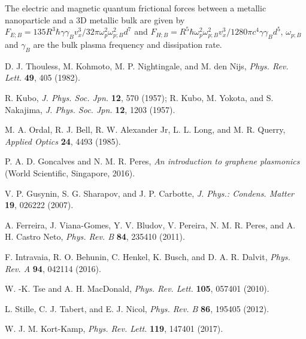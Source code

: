 \documentclass[10pt,aps,prl,superscriptaddress,showpacs,twocolumn]{revtex4-1}
\begin{document}
\begin{thebibliography}{1}
The electric and magnetic quantum frictional forces between a metallic nanoparticle and a 3D metallic bulk are given by $F_{E;B} = 135 R^3 \hbar \gamma \gamma_B v_x^3/ 32 \pi \omega_p^2  \omega_{p;B}^2 d^{7}$ and $F_{H;B} = R^5 \hbar \omega_p^2 \omega_{p;B}^2 v_x^3/1280 \pi c^4 \gamma \gamma_B d^{5}$,
$\omega_{p;B}$ and $\gamma_B$ are the bulk plasma frequency and dissipation rate.

D. J. Thouless, M. Kohmoto, M. P. Nightingale, and M. den Nijs,
{\it Phys. Rev. Lett.} {\bf 49}, 405 (1982).

R. Kubo, 
{\it J. Phys. Soc. Jpn.}  {\bf 12}, 570 (1957); 
R. Kubo, M. Yokota, and S. Nakajima,
{\it J. Phys. Soc. Jpn.} {\bf 12}, 1203 (1957). 

M. A. Ordal, R. J. Bell, R. W. Alexander Jr, L. L. Long, and M. R. Querry,
{\it Applied Optics} {\bf 24}, 4493 (1985).

P. A. D. Goncalves and N. M. R. Peres, 
{\it An introduction to graphene plasmonics}
(World Scientific, Singapore, 2016).

V. P. Gusynin, S. G. Sharapov, and J. P. Carbotte,
{\it J. Phys.: Condens. Matter} {\bf 19}, 026222 (2007).

A. Ferreira, J. Viana-Gomes, Y. V. Bludov, V. Pereira, N. M. R. Peres, and A. H. Castro Neto,
{\it Phys. Rev. B} {\bf 84}, 235410 (2011).

F. Intravaia, R. O. Behunin, C. Henkel, K. Busch, and D. A. R. Dalvit,
{\it Phys. Rev. A} {\bf 94}, 042114 (2016).

W. -K. Tse and A. H. MacDonald, 
{\it Phys. Rev. Lett.} {\bf 105}, 057401 (2010).

L. Stille, C. J. Tabert, and E. J. Nicol,
{\it Phys. Rev. B} {\bf 86}, 195405 (2012).

W. J. M. Kort-Kamp,
{\it Phys. Rev. Lett.} {\bf 119}, 147401 (2017).


\end{thebibliography}
\end{document}
